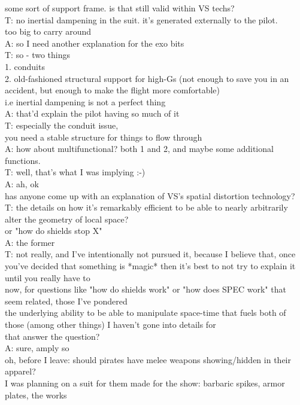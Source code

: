 some sort of support frame. is that still valid within VS techs?\\
T: no inertial dampening in the suit. it's generated externally to the pilot.\\
too big to carry around\\
A: so I need another explanation for the exo bits\\
T: so - two things\\
1. conduits\\
2. old-fashioned structural support for high-Gs (not enough to save you in an accident, but enough to make the flight more comfortable)\\
i.e inertial dampening is not a perfect thing\\
A: that'd explain the pilot having so much of it\\
T: especially the conduit issue,\\
you need a stable structure for things to flow through\\
A: how about multifunctional? both 1 and 2, and maybe some additional functions.\\
T: well, that's what I was implying :-)\\
A: ah, ok\\
has anyone come up with an explanation of VS's spatial distortion technology?\\
T: the details on how it's remarkably efficient to be able to nearly arbitrarily alter the geometry of local space?\\
 or "how do shields stop X"\\
A: the former\\
T: not really, and I've intentionally not pursued it, because I believe that, once you've decided that something is *magic* then it's best to not try to explain it until you really have to\\
now, for questions like "how do shields work" or "how does SPEC work" that seem related, those I've pondered\\
the underlying ability to be able to manipulate space-time that fuels both of those (among other things) I haven't gone into details for\\
that answer the question?\\
A: sure, amply so\\
oh, before I leave: should pirates have melee weapons showing/hidden in their apparel?\\
I was planning on a suit for them made for the show: barbaric spikes, armor plates, the works\\
